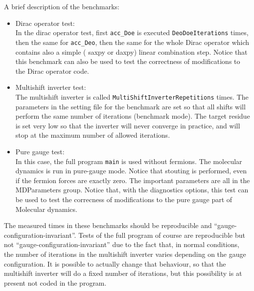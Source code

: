 A brief description of the benchmarks:
\begin{itemize}
 \item {Dirac operator test}: \\
In the dirac operator test, first \verb|acc_Doe| is executed \verb|DeoDoeIterations| 
times, then the same for \verb|acc_Deo|, then the same for the whole Dirac operator 
which contains also a simple (\textsf{ saxpy} or \textsf{ daxpy}) linear combination step.
Notice that this benchmark can also be used to test the correctness of modifications to the
Dirac operator code.
\item {Multishift inverter test}: \\
The multishift inverter is called \verb|MultiShiftInverterRepetitions| times.
The parameters in the setting file for the benchmark are set so that all shifts 
will perform the same number of iterations (benchmark mode). The target residue is set very low so that the 
inverter will never converge in practice, and will stop at the maximum number of allowed iterations.
\item {Pure gauge test}: \\
In this case, the full program \verb|main| is used without fermions. The molecular dynamics is run 
in pure-gauge mode. Notice that stouting is performed, even if the fermion forces are exactly zero.
The important parameters are all in the \textsf{ MDParameters} group.
Notice that, with the diagnostics options, this test can be used to test the correcness
of modifications to the pure gauge part of Molecular dynamics.
\end{itemize}

The measured times in these benchmarks should be reproducible and ``gauge-configuration-invariant''.
Tests of the full program of course are reproducible but not ``gauge-configuration-invariant'' due
to the fact that, in normal conditions, the number of iterations in the multishift inverter varies 
depending on the gauge configuration. It is possible to actually change that behaviour, so that 
the multishift inverter will do a fixed number of iterations, but this possibility is at present not coded 
in the program.

